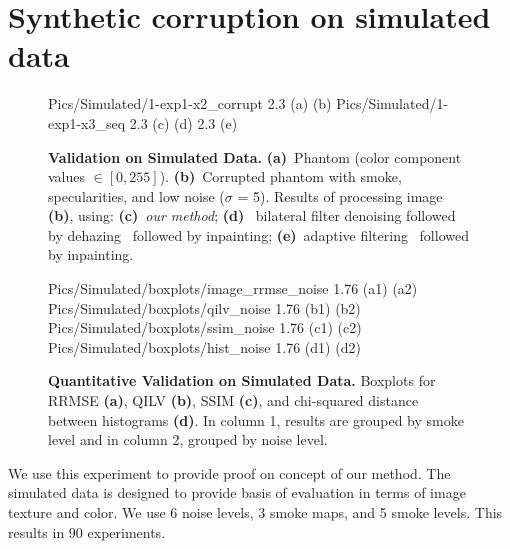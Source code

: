 \section{Synthetic corruption on simulated data}

\begin{figure}[h]
     {Pics/Simulated/1-exp1-x2_corrupt} {2.3} {(a)} {(b)}
     {Pics/Simulated/1-exp1-x3_seq} {2.3} {(c)} {(d)}
     {2.3} {(e)}
    \caption
    {
        {\bf Validation on Simulated Data. }
        {\bf (a)}~Phantom (color component values $\in [0,255]$).
        {\bf (b)}~Corrupted phantom with smoke, specularities, and low noise ($\sigma$ = 5).
        Results of processing image {\bf (b)}, using:
        {\bf (c)}~{\em our method};
        {\bf (d)}~ bilateral filter denoising followed by dehazing~\cite{he2011dark} followed by inpainting;
        {\bf (e)}~adaptive filtering~\cite{gibson2013wiener} followed by inpainting.
    }
    \label{fig:imagesPhantom1}
\end{figure}

\begin{figure}[h]
     {Pics/Simulated/boxplots/image_rrmse_noise} {1.76} {(a1)} {(a2)}
     {Pics/Simulated/boxplots/qilv_noise} {1.76} {(b1)} {(b2)}
     {Pics/Simulated/boxplots/ssim_noise} {1.76} {(c1)} {(c2)}
     {Pics/Simulated/boxplots/hist_noise} {1.76} {(d1)} {(d2)}
    \caption
    {
        {\bf Quantitative Validation on Simulated Data.}
        Boxplots for RRMSE \textbf{(a)}, QILV \textbf{(b)}, SSIM \textbf{(c)}, and chi-squared distance between histograms \textbf{(d)}.
        In column 1, results are grouped by smoke level and in column 2, grouped by noise level.
    }
    \label{fig:resultsQuantSimulated}
\end{figure}



We use this experiment to provide proof on concept of our method. The simulated data is designed to provide basis of evaluation in terms of image texture and color. We use 6 noise levels, 3 smoke maps, and 5 smoke levels. This results in 90 experiments.

